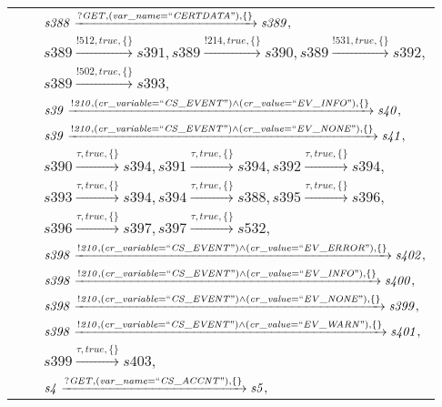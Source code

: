 \begin{tabular}{lcp{350px}}
& & $\mathit{s388}\xrightarrow{\mathit{?GET}, \mathit{(var\_name = ``CERTDATA")}, \{\}}\mathit{s389},$ \\
& & $\mathit{s389}\xrightarrow{\mathit{!512}, \mathit{true}, \{\}}\mathit{s391},\mathit{s389}\xrightarrow{\mathit{!214}, \mathit{true}, \{\}}\mathit{s390},\mathit{s389}\xrightarrow{\mathit{!531}, \mathit{true}, \{\}}\mathit{s392},$ \\
& & $\mathit{s389}\xrightarrow{\mathit{!502}, \mathit{true}, \{\}}\mathit{s393},$ \\
& & $\mathit{s39}\xrightarrow{\mathit{!210}, \mathit{(cr\_variable = ``CS\_EVENT") \land (cr\_value = ``EV\_INFO")}, \{\}}\mathit{s40},$ \\
& & $\mathit{s39}\xrightarrow{\mathit{!210}, \mathit{(cr\_variable = ``CS\_EVENT") \land (cr\_value = ``EV\_NONE")}, \{\}}\mathit{s41},$ \\
& & $\mathit{s390}\xrightarrow{\mathit{\tau}, \mathit{true}, \{\}}\mathit{s394},\mathit{s391}\xrightarrow{\mathit{\tau}, \mathit{true}, \{\}}\mathit{s394},\mathit{s392}\xrightarrow{\mathit{\tau}, \mathit{true}, \{\}}\mathit{s394},$ \\
& & $\mathit{s393}\xrightarrow{\mathit{\tau}, \mathit{true}, \{\}}\mathit{s394},\mathit{s394}\xrightarrow{\mathit{\tau}, \mathit{true}, \{\}}\mathit{s388},\mathit{s395}\xrightarrow{\mathit{\tau}, \mathit{true}, \{\}}\mathit{s396},$ \\
& & $\mathit{s396}\xrightarrow{\mathit{\tau}, \mathit{true}, \{\}}\mathit{s397},\mathit{s397}\xrightarrow{\mathit{\tau}, \mathit{true}, \{\}}\mathit{s532},$ \\
& & $\mathit{s398}\xrightarrow{\mathit{!210}, \mathit{(cr\_variable = ``CS\_EVENT") \land (cr\_value = ``EV\_ERROR")}, \{\}}\mathit{s402},$ \\
& & $\mathit{s398}\xrightarrow{\mathit{!210}, \mathit{(cr\_variable = ``CS\_EVENT") \land (cr\_value = ``EV\_INFO")}, \{\}}\mathit{s400},$ \\
& & $\mathit{s398}\xrightarrow{\mathit{!210}, \mathit{(cr\_variable = ``CS\_EVENT") \land (cr\_value = ``EV\_NONE")}, \{\}}\mathit{s399},$ \\
& & $\mathit{s398}\xrightarrow{\mathit{!210}, \mathit{(cr\_variable = ``CS\_EVENT") \land (cr\_value = ``EV\_WARN")}, \{\}}\mathit{s401},$ \\
& & $\mathit{s399}\xrightarrow{\mathit{\tau}, \mathit{true}, \{\}}\mathit{s403},$ \\
& & $\mathit{s4}\xrightarrow{\mathit{?GET}, \mathit{(var\_name = ``CS\_ACCNT")}, \{\}}\mathit{s5},$ \\

\end{tabular}

